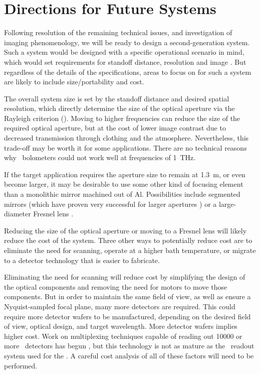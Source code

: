 \section{Directions for Future Systems}

Following resolution of the remaining technical issues, and investigation of imaging phenomenology, we will be ready to design a second-generation system.
Such a system would be designed with a specific operational scenario in mind, which would set requirements for standoff distance, resolution and image \NETD.
But regardless of the details of the specifications, areas to focus on for such a system are likely to include size/portability and cost.

The overall system size is set by the standoff distance and desired spatial resolution, which directly determine the size of the optical aperture via the Rayleigh criterion ().
Moving to higher frequencies can reduce the size of the required optical aperture, but at the cost of lower image contrast due to decreased transmission through clothing and the atmosphere.
Nevertheless, this trade-off may be worth it for some applications.
There are no technical reasons why \TES\ bolometers could not work well at frequencies of \SI{1}{\THz}.

If the target application requires the aperture size to remain at \SI{1.3}{\m}, or even become larger, it may be desirable to use some other kind of focusing element than a monolithic mirror machined out of Al.
Possibilities include segmented mirrors (which have proven very successful for larger apertures \cite{fowler_optical_2007}) or a large-diameter Fresnel lens \cite{black_millimeter-wave_1987}.

Reducing the size of the optical aperture or moving to a Fresnel lens will likely reduce the cost of the system.
Three other ways to potentially reduce cost are to eliminate the need for scanning, operate at a higher bath temperature, or migrate to a detector technology that is easier to fabricate.

Eliminating the need for scanning will reduce cost by simplifying the design of the optical components and removing the need for motors to move those components.
But in order to maintain the same field of view, as well as ensure a Nyquist-sampled focal plane, many more detectors are required.
This could require more detector wafers to be manufactured, depending on the desired field of view, optical design, and target wavelength.
More detector wafers implies higher cost.
Work on multiplexing techniques capable of reading out \num{10000} or more \TES\ detectors has begun \cite{irwin_advanced_2012}, but this technology is not as mature as the \TDM\ readout system used for the \Imager.
A careful cost analysis of all of these factors will need to be performed.

